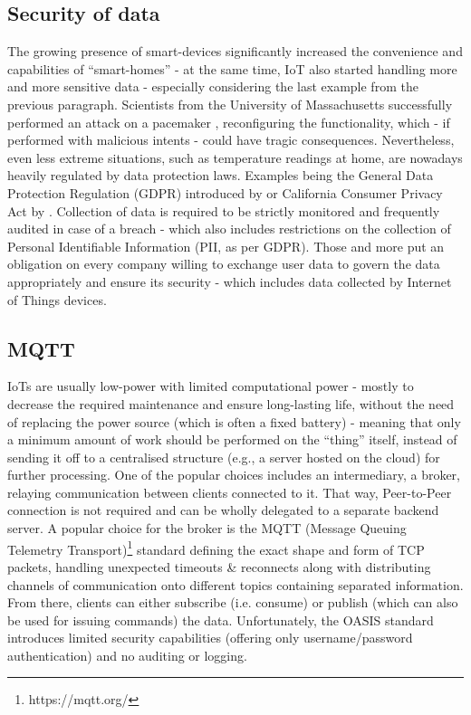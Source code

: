 \subsection{Security of data}
The growing presence of smart-devices significantly increased the convenience and capabilities of ``smart-homes'' - at the same time, IoT also started handling more and more sensitive data - especially considering the last example from the previous paragraph. Scientists from the University of Massachusetts successfully performed an attack on a pacemaker \cite{4531149}, reconfiguring the functionality, which - if performed with malicious intents - could have tragic consequences. Nevertheless, even less extreme situations, such as temperature readings at home, are nowadays heavily regulated by data protection laws. Examples being the General Data Protection Regulation (GDPR) introduced by \citet{EUdataregulations2018} or California Consumer Privacy Act by \citet{CCPA}. Collection of data is required to be strictly monitored and frequently audited in case of a breach - which also includes restrictions on the collection of Personal Identifiable Information (PII, as per GDPR). Those and more put an obligation on every company willing to exchange user data to govern the data appropriately and ensure its security - which includes data collected by Internet of Things devices.

\subsection{MQTT}
IoTs are usually low-power with limited computational power - mostly to decrease the required maintenance and ensure long-lasting life, without the need of replacing the power source (which is often a fixed battery) - meaning that only a minimum amount of work should be performed on the ``thing'' itself, instead of sending it off to a centralised structure (e.g., a server hosted on the cloud) for further processing. One of the popular choices includes an intermediary, a broker, relaying communication between clients connected to it. That way, Peer-to-Peer connection is not required and can be wholly delegated to a separate backend server. A popular choice for the broker is the MQTT (Message Queuing Telemetry Transport)\footnote{https://mqtt.org/} standard defining the exact shape and form of TCP packets, handling unexpected timeouts \& reconnects along with distributing channels of communication onto different topics containing separated information. From there, clients can either subscribe (i.e. consume) or publish (which can also be used for issuing commands) the data. Unfortunately, the OASIS standard introduces limited security capabilities (offering only username/password authentication) and no auditing or logging.

